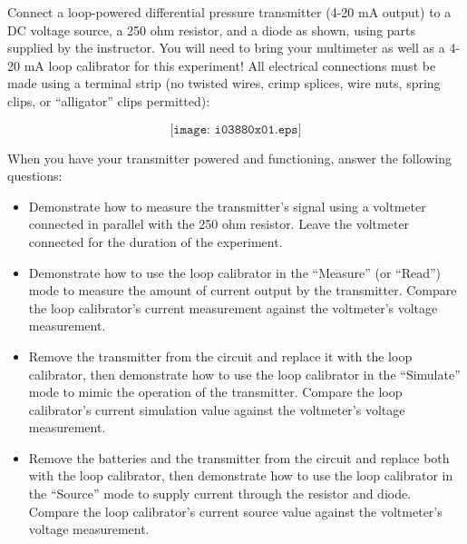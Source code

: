 

Connect a loop-powered differential pressure transmitter (4-20 mA output) to a DC voltage source, a 250 ohm resistor, and a diode as shown, using parts supplied by the instructor.  You will need to bring your multimeter as well as a 4-20 mA loop calibrator for this experiment!  All electrical connections must be made using a terminal strip (no twisted wires, crimp splices, wire nuts, spring clips, or ``alligator'' clips permitted):

$$\texttt{[image: i03880x01.eps]}$$

\vskip 10pt

When you have your transmitter powered and functioning, answer the following questions:

\begin{itemize}
\item{} Demonstrate how to measure the transmitter's signal using a voltmeter connected in parallel with the 250 ohm resistor.  Leave the voltmeter connected for the duration of the experiment.
\vskip 10pt
\item{} Demonstrate how to use the loop calibrator in the ``Measure'' (or ``Read'') mode to measure the amount of current output by the transmitter.  Compare the loop calibrator's current measurement against the voltmeter's voltage measurement.
\vskip 10pt
\item{} Remove the transmitter from the circuit and replace it with the loop calibrator, then demonstrate how to use the loop calibrator in the ``Simulate'' mode to mimic the operation of the transmitter.  Compare the loop calibrator's current simulation value against the voltmeter's voltage measurement.
\vskip 10pt
\item{} Remove the batteries and the transmitter from the circuit and replace both with the loop calibrator, then demonstrate how to use the loop calibrator in the ``Source'' mode to supply current through the resistor and diode.  Compare the loop calibrator's current source value against the voltmeter's voltage measurement.
\end{itemize}








